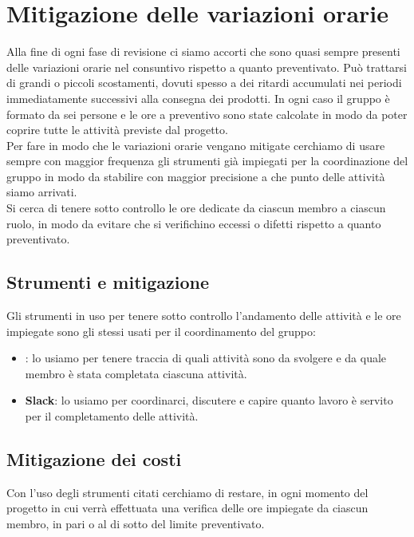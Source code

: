 \newpage

\section{Mitigazione delle variazioni orarie}	\label{mitigazione variazioni}
Alla fine di ogni fase di revisione ci siamo accorti che sono quasi sempre presenti delle variazioni orarie nel consuntivo rispetto a quanto preventivato.
Può trattarsi di grandi o piccoli scostamenti, dovuti spesso a dei ritardi accumulati nei periodi immediatamente successivi alla consegna dei prodotti. In ogni caso il gruppo è formato da sei persone e le ore a preventivo sono state calcolate in modo da poter coprire tutte le attività previste dal progetto.\\
Per fare in modo che le variazioni orarie vengano mitigate cerchiamo di usare sempre con maggior frequenza gli strumenti già impiegati per la coordinazione del gruppo in modo da stabilire con maggior precisione a che punto delle attività siamo arrivati.\\
Si cerca di tenere sotto controllo le ore dedicate da ciascun membro a ciascun ruolo, in modo da evitare che si verifichino eccessi o difetti rispetto a quanto preventivato.

    \subsection{Strumenti e mitigazione}
	Gli strumenti in uso per tenere sotto controllo l'andamento delle attività e le ore impiegate sono gli stessi usati per il coordinamento del gruppo:
	\begin{itemize}
	    \item \textbf{}: lo usiamo per tenere traccia di quali attività sono da svolgere e da quale membro è stata completata ciascuna attività.
	    \item \textbf{Slack}: lo usiamo per coordinarci, discutere e capire quanto lavoro è servito per il completamento delle attività.
	\end{itemize}
	
	\subsection{Mitigazione dei costi}
	Con l'uso degli strumenti citati cerchiamo di restare, in ogni momento del progetto in cui verrà effettuata una verifica delle ore impiegate da ciascun membro, in pari o al di sotto del limite preventivato.

